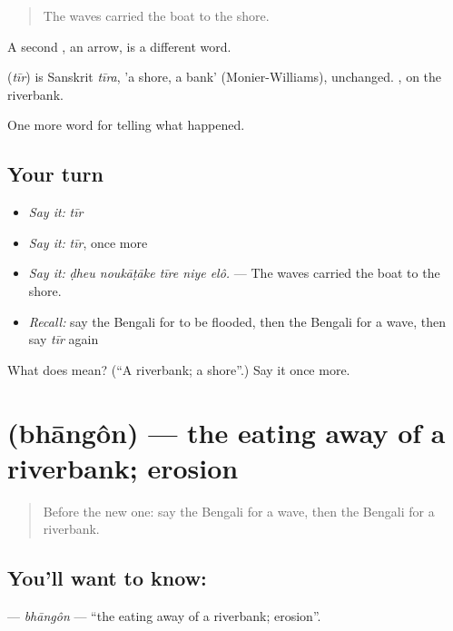 \begin{quote}
The waves carried the boat to the shore.
\end{quote}

A second , an arrow, is a different word.

\begin{cousinweb}
\textbf{} (\emph{tīr}) is Sanskrit \emph{tīra}, 'a shore, a bank' (Monier-Williams), unchanged.  , on the riverbank.
\end{cousinweb}

\begin{grammarlens}[title={What you've built}]
One more word for telling what happened.
\end{grammarlens}

\subsection*{Your turn}
\begin{itemize}
\raggedright
  \item \emph{Say it:} \emph{tīr}
  \item \emph{Say it:} \emph{tīr}, once more
  \item \emph{Say it:} \emph{ḍheu noukāṭāke tīre niye elô.} — The waves carried the boat to the shore.
  \item \emph{Recall:} say the Bengali for to be flooded, then the Bengali for a wave, then say \emph{tīr} again
\end{itemize}

\begin{tcolorbox}[breakable,colback=teal!4,colframe=teal!35!black,title={Before you move on}]
What does  mean? (\textquotedblleft{}A riverbank; a shore\textquotedblright{}.) Say it once more.
\end{tcolorbox}
\section[\texorpdfstring{\bn{ভাঙন} (bhāngôn)}{ভাঙন (bhāngôn)}]{ (bhāngôn) — the eating away of a riverbank; erosion}

\label{lesson:BN-C290-bhangon}



\begin{quote}
Before the new one: say the Bengali for a wave, then the Bengali for a riverbank.
\end{quote}

\subsection*{You'll want to know: }
\textbf{} — \emph{bhāngôn} — \textquotedblleft{}the eating away of a riverbank; erosion\textquotedblright{}.

